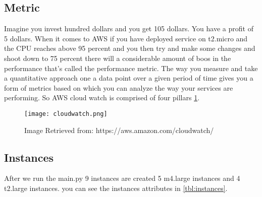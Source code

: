 \documentclass[12pt]{article}
\begin{document}
        \subsection{Metric}
        Imagine you invest hundred dollars and you get 105 dollars. You have a profit of 5 dollars.
        When it comes to AWS if you have deployed service on t2.micro and the CPU reaches above 95 percent and you then try and make some changes and shoot down to 75 percent there will a considerable amount of boos in the performance that's called the performance metric. The way you measure and take a quantitative approach one a data point over a given period of time gives you a form of metrics based on which you can analyze the way your services are performing. So AWS cloud watch is comprised of four pillars \ref{fig:cw}.

        \begin{figure}[htpb]
        \centering
        \texttt{[image: cloudwatch.png]}
            \caption{Image Retrieved from: https://aws.amazon.com/cloudwatch/}
            \label{fig:cw}
        \end{figure}

        \subsection{Instances}
        After we run the main.py 9 instances are created 5 m4.large instances and 4 t2.large instances. you can see the instances attributes in \ref{tbl:instances}. 

        \begin{table}[]
            \centering
        \caption{Instances Specifications}
            \label{tbl:instances}
        \end{table}
\end{document}
